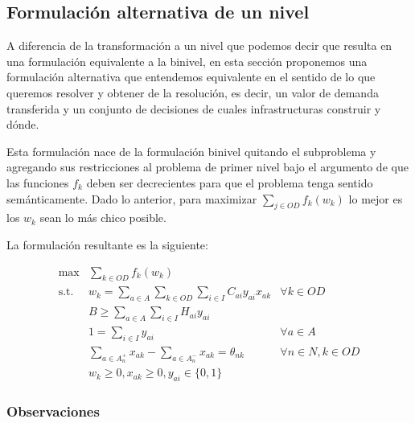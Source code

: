 \documentclass{article}
\begin{document}
  \subsection{Formulación alternativa de un nivel}
  \label{altOneLevelFormulation}

  A diferencia de la transformación a un nivel que podemos decir que resulta en una formulación equivalente a la binivel, en esta sección proponemos una formulación alternativa que entendemos equivalente en el sentido de lo que queremos resolver y obtener de la resolución, es decir, un valor de demanda transferida y un conjunto de decisiones de cuales infrastructuras construir y dónde.

  Esta formulación nace de la formulación binivel quitando el subproblema y agregando sus restricciones al problema de primer nivel bajo el argumento de que las funciones $f_k$ deben ser decrecientes para que el problema tenga sentido semánticamente. Dado lo anterior, para maximizar $\sum_{j \in OD}f_k(w_k)$ lo mejor es los $w_k$ sean lo más chico posible.

  La formulación resultante es la siguiente:

  \begin{align}
    \text{max}    & \sum_{k \in OD} f_k(w_k)                                                         & \label{eq:objectivealt} \\
    \text{s.t.}\; & w_k = \sum_{a \in A} \sum_{k \in OD} \sum_{i \in I} C_{ai}y_{ai}x_{ak}           & \forall k \in OD \label{eq:shortestpathalt} \\
                  & B \geq \sum_{a \in A} \sum_{i \in I} H_{ai}y_{ai}                                & \label{eq:respectbudgetalt} \\
                  & 1 = \sum_{i \in I} y_{ai}                                                        & \forall a \in A \label{eq:alwaysoneyalt} \\
                  & \sum_{a \in A_n^+} x_{ak} - \sum_{a \in A_n^-} x_{ak} = \theta_{nk}              & \forall n \in N, k \in OD \label{eq:flowbalancealt} \\
                  & w_k \geq 0, x_{ak} \geq 0, y_{ai} \in \{0,1\}                                    & \nonumber
  \end{align}

  \subsubsection*{Observaciones}
\end{document}

